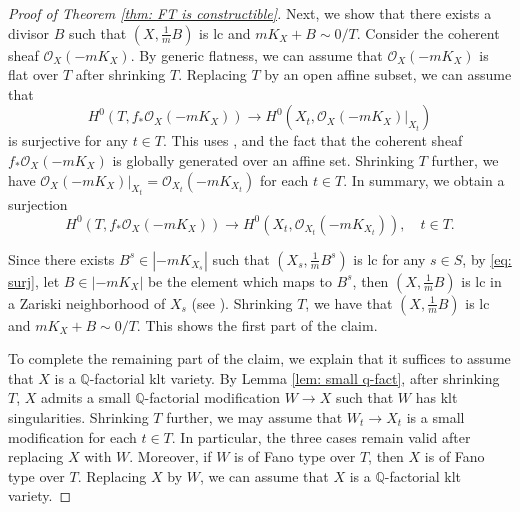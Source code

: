 \documentclass[11pt,oneside,reqno]{amsart}
\numberwithin{equation}{section}
\theoremstyle{definition}
\newcommand{\bQ}{\mathbb{Q}}
\newcommand{\mO}{\mathcal{O}}
\begin{document}
\begin{proof}[Proof of Theorem \ref{thm: FT is constructible}]
Next, we show that there exists a divisor $B$ such that $(X, \frac 1 m B)$ is lc and $mK_X+ B \sim 0/T$. Consider the coherent sheaf $\mO_X(-mK_X)$. By generic flatness, we can assume that $\mO_X(-mK_X)$ is flat over $T$ after shrinking $T$. Replacing $T$ by an open affine subset, we can assume that
\[
H^0(T, f_*\mO_X(-mK_X)) \to H^0(X_t, \mO_X(-mK_X)|_{X_t})
\] is surjective for any $t\in T$. This uses \cite[III, Theorem 12.8, Corollary 12.9]{Har77}, and the fact that the coherent sheaf $f_*\mO_X(-mK_X)$ is globally generated over an affine set. Shrinking $T$ further, we have $\mO_X(-mK_X)|_{X_t} = \mO_{X_t}(-mK_{X_t})$ for each $t\in T$. In summary, we obtain a surjection
\begin{equation}\label{eq: surj}
H^0(T, f_*\mO_X(-mK_X)) \to H^0(X_t, \mO_{X_t}(-mK_{X_t})), \quad t\in T.
\end{equation} 

Since there exists $B^s\in |-mK_{X_s}|$ such that $(X_s, \frac 1 m B^s)$ is lc for any $s\in S$, by \eqref{eq: surj}, let $B\in |-mK_X|$ be the element which maps to $B^s$, then $(X, \frac 1 m B)$ is lc in a Zariski neighborhood of $X_s$ (see \cite[Theorem 9.5.19]{Laz04b}). Shrinking $T$, we have that $(X, \frac 1 m B)$ is lc and $mK_X+ B \sim 0/T$. This shows the first part of the claim.

To complete the remaining part of the claim, we explain that it suffices to assume that $X$ is a $\bQ$-factorial klt variety. By Lemma \ref{lem: small q-fact}, after shrinking $T$, $X$ admits a small $\bQ$-factorial modification $W \to X$ such that $W$ has klt singularities. Shrinking $T$ further, we may assume that $W_t \to X_t$ is a small modification for each $t \in T$. In particular, the three cases remain valid after replacing $X$ with $W$. Moreover, if $W$ is of Fano type over $T$, then $X$ is of Fano type over $T$. Replacing $X$ by $W$, we can assume that $X$ is a $\bQ$-factorial klt variety. 


\end{proof}
\end{document}
